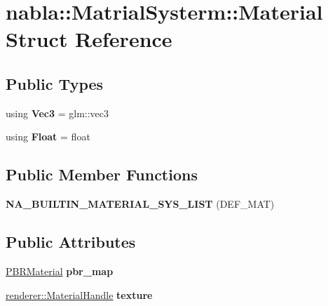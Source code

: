 \hypertarget{structnabla_1_1_matrial_systerm_1_1_material}{}\section{nabla\+::Matrial\+Systerm\+::Material Struct Reference}
\label{structnabla_1_1_matrial_systerm_1_1_material}
\subsection*{Public Types}
\begin{DoxyCompactItemize}
\item 
\mbox{\label{structnabla_1_1_matrial_systerm_1_1_material_aacf10f893dd621117a786e1aa72ade7b}} 
using {\bfseries Vec3} = glm\+::vec3
\item 
\mbox{\label{structnabla_1_1_matrial_systerm_1_1_material_ae5e7fd3ce768da41ce109075c0977338}} 
using {\bfseries Float} = float
\end{DoxyCompactItemize}
\subsection*{Public Member Functions}
\begin{DoxyCompactItemize}
\item 
\mbox{\label{structnabla_1_1_matrial_systerm_1_1_material_ae9c38fd5dcbd34c3351b6e1959e60e8d}} 
{\bfseries N\+A\+\_\+\+B\+U\+I\+L\+T\+I\+N\+\_\+\+M\+A\+T\+E\+R\+I\+A\+L\+\_\+\+S\+Y\+S\+\_\+\+L\+I\+ST} (D\+E\+F\+\_\+\+M\+AT)
\end{DoxyCompactItemize}
\subsection*{Public Attributes}
\begin{DoxyCompactItemize}
\item 
\mbox{\label{structnabla_1_1_matrial_systerm_1_1_material_a465de705ddc4318c71f4fdef125c5680}} 
\mbox{\hyperlink{structnabla_1_1_matrial_systerm_1_1_p_b_r_material}{P\+B\+R\+Material}} {\bfseries pbr\+\_\+map}
\item 
\mbox{\label{structnabla_1_1_matrial_systerm_1_1_material_aa213ca48d60422d731251af5c8fd30d6}} 
\mbox{\hyperlink{classnabla_1_1renderer_1_1_handle}{renderer\+::\+Material\+Handle}} {\bfseries texture}
\end{DoxyCompactItemize}


